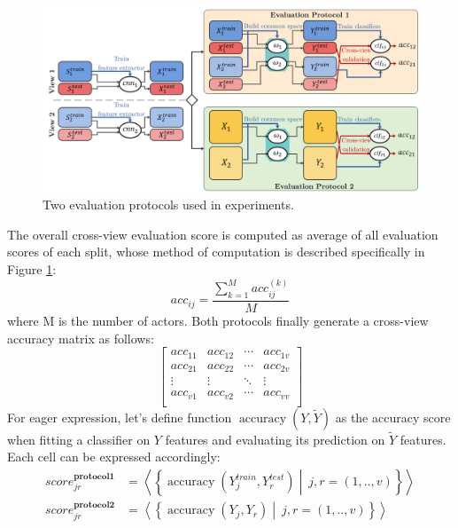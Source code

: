     \begin{figure}[htbp]
      \centering
      \includegraphics[width=1\linewidth]{figs/protocol.png}
      \caption{Two evaluation protocols used in experiments.}
      \label{Fig:ep}
    \end{figure}
    The overall cross-view evaluation score is computed as average of all evaluation scores of each split, whose method of computation is described specifically in Figure \ref{Fig:ep}:
    \begin{equation}
        {acc}_{ij} = \frac{\sum_{k=1}^M {acc}^{(k)}_{ij}}{M}
    \end{equation}
    where M is the number of actors. Both protocols finally generate a cross-view accuracy matrix as follows:
    \begin{equation}
        \left[\begin{matrix}{acc}_{11}&{acc}_{12}&\cdots&{acc}_{1v}\\{acc}_{21}&{acc}_{22}&\cdots&{acc}_{2v}\\\vdots&\vdots&\ddots&\vdots\\{acc}_{v1}&{acc}_{v2}&\cdots&{acc}_{vv}\\\end{matrix}\right]
        \label{eq:multi-view_scores}
    \end{equation}
    For eager expression, let's define function $\operatorname{accuracy}\left(Y, \tilde{Y}\right)$ as the accuracy score when fitting a classifier on $Y$ features and evaluating its prediction on $\tilde{Y}$ features. Each cell can be expressed accordingly:
    \begin{align}
        {score}_{jr}^{\boldsymbol{protocol 1}} & =\left<\left\{\operatorname{accuracy}\left(Y_j^{train},Y_r^{test}\right)\middle|\ j,r=(1,..,v)\right\}\right> \\
        {score}_{jr}^{\boldsymbol{protocol 2}} & =\left<\left\{\operatorname{accuracy}\left(Y_j,Y_r\right)\middle|\ j,r=(1,..,v)\right\}\right>
    \end{align}

